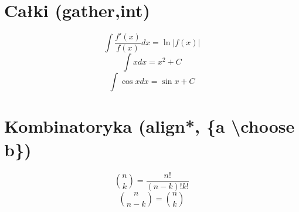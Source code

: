 \documentclass[12pt]{article}
\begin{document}
\section{Całki (gather,int)}

\begin{equation}
	\int \frac{f'(x)}{f(x)} dx = \ln{|f(x)|}
\end{equation}
\begin{equation}
	\int x dx = x^2 + C
\end{equation}
\begin{equation}
	\int \cos x dx = \sin x + C
\end{equation}

\section{Kombinatoryka (align*, \{a \textbackslash choose b\})}

$${n \choose k} = \frac{n!}{(n-k)!k!}$$
$${n \choose n - k} = {n \choose k}$$

\tableofcontents
\end{document}
